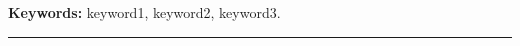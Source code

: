 \documentclass[12pt,twoside,a4paper]{book}
\makeatletter
\renewcommand{\chaptermark}[1]{\markboth{#1}{}}
\def\thickhrulefill{\leavevmode \leaders \hrule height .1ex \hfill \kern \z@}
\makeatother
\begin{document}
\noindent \textbf{Keywords:} keyword1, keyword2, keyword3.

\vspace*{1cm}%
\thickhrulefill

\newpage
\tableofcontents    %

%
%

\listoffigures

\listoftables

\mainmatter


\onehalfspacing            %



%








\appendix
\end{document}
